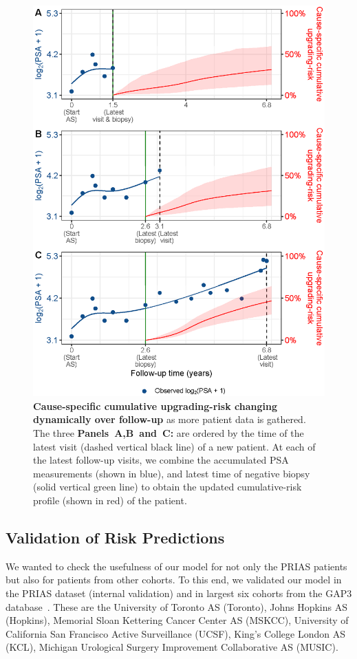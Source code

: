\begin{figure}
\centerline{\includegraphics[width=\columnwidth]{images/dynrisk_plot_102.eps}}
\caption{\textbf{Cause-specific cumulative upgrading-risk changing dynamically over follow-up} as more patient data is gathered. The three \textbf{Panels~A,B~and~C:} are ordered by the time of the latest visit (dashed vertical black line) of a new patient. At each of the latest follow-up visits, we combine the accumulated PSA measurements (shown in blue), and latest time of negative biopsy (solid vertical green line) to obtain the updated cumulative-risk profile (shown in red) of the patient.}
\label{fig:dynrisk_plot_102}
\end{figure}

\clearpage
\subsection{Validation of Risk Predictions}
We wanted to check the usefulness of our model for not only the PRIAS patients but also for patients from other cohorts. To this end, we validated our model in the PRIAS dataset (internal validation) and in largest six cohorts from the GAP3 database~\citep{gap3_2018}. These are the University of Toronto AS (Toronto), Johns Hopkins AS (Hopkins), Memorial Sloan Kettering Cancer Center AS (MSKCC), University of California San Francisco Active Surveillance (UCSF), King's College London AS (KCL), Michigan Urological Surgery Improvement Collaborative AS (MUSIC).


